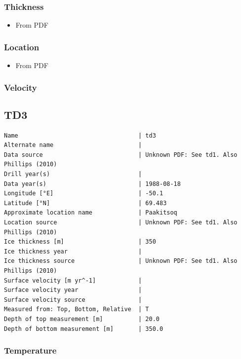 \documentclass[article,a4paper,times,11pt,twoside]{article}
\begin{document}
\subsubsection{Thickness}
\label{sec:org0e77216}

\begin{itemize}
\item From PDF
\end{itemize}

\subsubsection{Location}
\label{sec:org5d47837}

\begin{itemize}
\item From PDF
\end{itemize}

\subsubsection{Velocity}
\label{sec:org5daeb82}
\clearpage
\subsection{TD3}
\label{sec:org0bc320e}
\begin{verbatim}
Name                                  | td3
Alternate name                        | 
Data source                           | Unknown PDF: See td1. Also Phillips (2010)
Drill year(s)                         | 
Data year(s)                          | 1988-08-18
Longitude [°E]                        | -50.1
Latitude [°N]                         | 69.483
Approximate location name             | Paakitsoq
Location source                       | Unknown PDF: See td1. Also Phillips (2010)
Ice thickness [m]                     | 350
Ice thickness year                    | 
Ice thickness source                  | Unknown PDF: See td1. Also Phillips (2010)
Surface velocity [m yr^-1]            | 
Surface velocity year                 | 
Surface velocity source               | 
Measured from: Top, Bottom, Relative  | T
Depth of top measurement [m]          | 20.0
Depth of bottom measurement [m]       | 350.0
\end{verbatim}

\subsubsection{Temperature}
\label{sec:orgcedb1a0}
\end{document}
